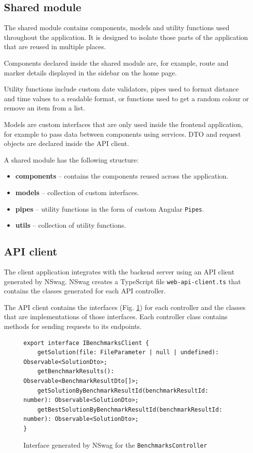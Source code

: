 \documentclass[a4paper,twoside,12pt]{book}
\begin{document}
\subsection{Shared module}

The shared module contains components, models and utility functions used throughout the application. It is designed to isolate those parts of the application that are reused in multiple places. 

Components declared inside the shared module are, for example, route and marker details displayed in the sidebar on the home page. 

Utility functions include custom date validators, pipes used to format distance and time values to a readable format, or functions used to get a random colour or remove an item from a list. 

Models are custom interfaces that are only used inside the frontend application, for example to pass data between components using services. DTO and request objects are declared inside the API client.

A shared module has the following structure:

\begin{itemize}
    \item \textbf{components} -- contains the components reused across the application.
    \item \textbf{models} -- collection of custom interfaces.
    \item \textbf{pipes} -- utility functions in the form of custom Angular \lstinline{Pipes}.
    \item \textbf{utils} -- collection of utility functions.
\end{itemize}

\subsection{API client}

The client application integrates with the backend server using an API client generated by NSwag. NSwag creates a TypeScript file \lstinline{web-api-client.ts} that contains the classes generated for each API controller. 

The API client contains the interfaces (Fig. \ref{fig:controllerInterface}) for each controller and the classes that are implementations of those interfaces. Each controller class contains methods for sending requests to its endpoints.

\begin{figure}[htb]
\centering
\begin{lstlisting}
export interface IBenchmarksClient {
    getSolution(file: FileParameter | null | undefined): Observable<SolutionDto>;
    getBenchmarkResults(): Observable<BenchmarkResultDto[]>;
    getSolutionByBenchmarkResultId(benchmarkResultId: number): Observable<SolutionDto>;
    getBestSolutionByBenchmarkResultId(benchmarkResultId: number): Observable<SolutionDto>;
}
\end{lstlisting}
\caption{Interface generated by NSwag for the \lstinline{BenchmarksController}}
\label{fig:controllerInterface}
\end{figure}
\end{document}
